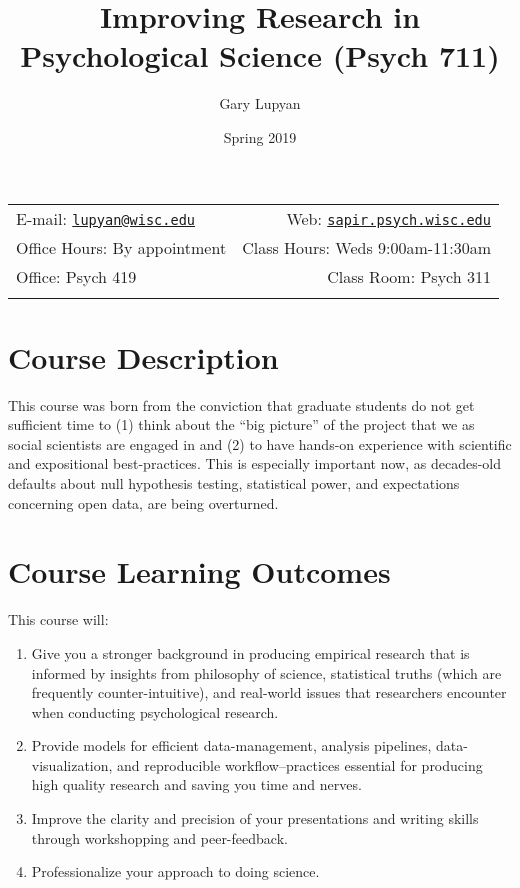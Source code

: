 \documentclass[11pt,man]{article}
\title{Improving Research in Psychological Science (Psych 711)}
\author{Gary Lupyan}
\date{Spring 2019}
\begin{document}
  

		\maketitle
		
	
		\thispagestyle{firststyle}



	\noindent \begin{tabular*}{\textwidth}{ @{\extracolsep{\fill}} lr @{\extracolsep{\fill}}}


E-mail: \texttt{\href{mailto:lupyan@wisc.edu}{\nolinkurl{lupyan@wisc.edu}}} & Web: \href{http://sapir.psych.wisc.edu}{\tt sapir.psych.wisc.edu}\\
Office Hours: By appointment  &  Class Hours: Weds 9:00am-11:30am\\
Office: Psych 419  & Class Room: Psych 311\\
	&  \\
	\hline
	\end{tabular*}
	
\vspace{2mm}
	


\section{Course Description}\label{course-description}

This course was born from the conviction that graduate students do not
get sufficient time to (1) think about the ``big picture'' of the
project that we as social scientists are engaged in and (2) to have
hands-on experience with scientific and expositional best-practices.
This is especially important now, as decades-old defaults about null
hypothesis testing, statistical power, and expectations concerning open
data, are being overturned.

\section{Course Learning Outcomes}\label{course-learning-outcomes}

This course will:

\begin{enumerate}
\def\labelenumi{\arabic{enumi}.}
\item
  Give you a stronger background in producing empirical research that is
  informed by insights from philosophy of science, statistical truths
  (which are frequently counter-intuitive), and real-world issues that
  researchers encounter when conducting psychological research.
\item
  Provide models for efficient data-management, analysis pipelines,
  data-visualization, and reproducible workflow--practices essential for
  producing high quality research and saving you time and nerves.
\item
  Improve the clarity and precision of your presentations and writing
  skills through workshopping and peer-feedback.
\item
  Professionalize your approach to doing science.
\end{enumerate}
\end{document}
